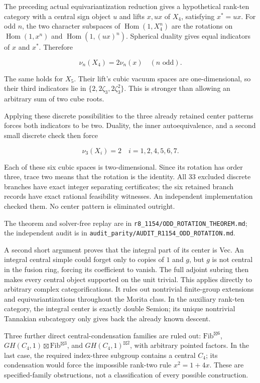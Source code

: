 \documentclass[
  11pt,
]{article}
\begin{document}
The preceding actual equivariantization reduction gives a hypothetical
rank-ten category with a central sign object \(u\) and lifts \(x,ux\) of
\(X_4\), satisfying \(x^*=ux\). For odd \(n\), the two character
subspaces of \(\operatorname{Hom}(1,X_4^n)\) are the rotations on
\(\operatorname{Hom}(1,x^n)\) and \(\operatorname{Hom}(1,(ux)^n)\).
Spherical duality gives equal indicators of \(x\) and \(x^*\). Therefore

\[
\nu_n(X_4)=2\nu_n(x)\quad(n\text{ odd}).
\]

The same holds for \(X_5\). Their lift's cubic vacuum spaces are
one-dimensional, so their third indicators lie in
\(\{2,2\zeta_3,2\zeta_3^2\}\). This is stronger than allowing an
arbitrary sum of two cube roots.

Applying these discrete possibilities to the three already retained
center patterns forces both indicators to be two. Duality, the inner
autoequivalence, and a second small discrete check then force

\[
\boxed{\nu_3(X_i)=2\quad
i=1,2,4,5,6,7.}
\]

Each of these six cubic spaces is two-dimensional. Since its rotation
has order three, trace two means that the rotation is the identity. All
33 excluded discrete branches have exact integer separating
certificates; the six retained branch records have exact rational
feasibility witnesses. An independent implementation checked them. No
center pattern is eliminated outright.

The theorem and solver-free replay are in
\texttt{r8\_1154/ODD\_ROTATION\_THEOREM.md}; the independent audit is in
\texttt{audit\_parity/AUDIT\_R1154\_ODD\_ROTATION.md}.

A second short argument proves that the integral part of its center is
Vec. An integral central simple could forget only to copies of \(1\) and
\(g\), but \(g\) is not central in the fusion ring, forcing its
coefficient to vanish. The full adjoint subring then makes every central
object supported on the unit trivial. This applies directly to arbitrary
complex categorifications. It rules out nontrivial finite-group
extensions and equivariantizations throughout the Morita class. In the
auxiliary rank-ten category, the integral center is exactly double
Semion; its unique nontrivial Tannakian subcategory only gives back the
already known descent.

Three further direct central-condensation families are ruled out:
\(\mathrm{Fib}^{\boxtimes6}\),
\(GH(C_4,1)\boxtimes\mathrm{Fib}^{\boxtimes3}\), and
\(GH(C_4,1)^{\boxtimes2}\), with arbitrary pointed factors. In the last
case, the required index-three subgroup contains a central \(C_4\); its
condensation would force the impossible rank-two rule \(x^2=1+4x\).
These are specified-family obstructions, not a classification of every
possible construction.
\end{document}
